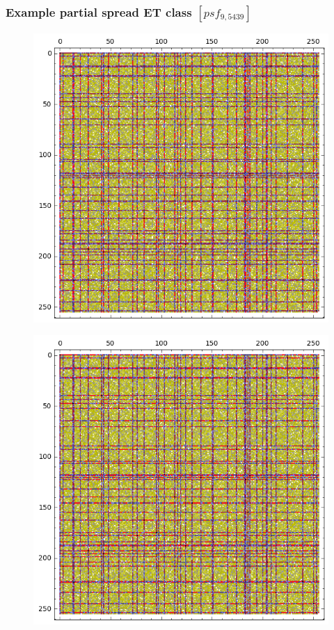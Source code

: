 \documentclass[pdf,sprung,slideColor,nocolorBG]{beamer}
\newenvironment{colortheme}[1]{
\def\ProvidesPackageRCS $##1${\relax}
\renewcommand{\ProcessOptions}{\relax}
\makeatletter

\makeatother
}{}
\begin{document}
\begin{colortheme}{jubata}
\begin{frame}
\frametitle{Example partial spread ET class $[psf_{9,5439}]$}
\begin{figure}
\centering
\begin{minipage}{.48\textwidth}
  \centering
  \includegraphics[width=.9\linewidth]{../matrix_plot/psf_9_5439_bent_cayley_graph_index_matrix.png}
  \label{fig:psf_9_5439_bent_cayley_graph_index_matrix}
\end{minipage}
\begin{minipage}{.48\textwidth}
  \centering
  \includegraphics[width=.9\linewidth]{../matrix_plot/psf_9_5439_dual_cayley_graph_index_matrix.png}

\end{minipage}
\end{figure}
\end{frame}
\end{colortheme}
\end{document}
